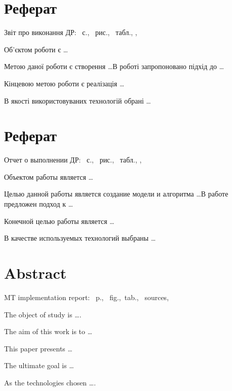 \section*{Реферат}
\skipline
Звіт про виконання ДР:
~с., ~рис., ~табл.,
,
\skipline

\skipline

Об'єктом роботи є \ldots

Метою даної роботи є створення \ldots В роботі запропоновано підхід до \ldots

Кінцевою метою роботи є реалізація \ldots

В якості використовуваних технологій обрані \ldots

\section*{Реферат}
\skipline
Отчет о выполнении ДР:
~с., ~рис., ~табл.,
,
\skipline

\skipline

Объектом работы является \ldots

Целью данной работы является создание модели и алгоритма \ldots В работе предложен
подход к \ldots

Конечной целью работы является \ldots

В качестве используемых технологий выбраны \ldots

\section*{Abstract}
\skipline
MT implementation report:
~p., ~fig.,~tab.,
~sources,
\skipline

\skipline

The object of study is \ldots.

The aim of this work is to \ldots

This paper presents \ldots

The ultimate goal is \ldots

As the technologies chosen \ldots.
